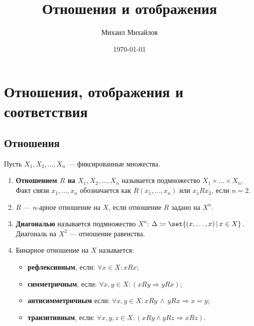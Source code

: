 \documentclass{article}
\title{Отношения и отображения}
\author{Михаил Михайлов}
\date{\today}
\begin{document}
\maketitle
\tableofcontents

\section{Отношения, отображения и соответствия}

\subsection{Отношения}
\begin{definition}
    \label{def:relation}
    Пусть \(X_1, X_2, \ldots, X_n\) --- фиксированные множества.
    
    \begin{enumerate}
        \item \textbf{Отношением \(R\) на \(X_1, X_2, \ldots, X_n\)} называется подмножество \(X_1 \times \ldots \times X_n\). Факт связи \(x_1, \ldots, x_n\) обозначается как \(R(x_1, \ldots, x_n)\) или \(x_1 R x_2\), если \(n = 2\).
        \item \(R\) --- \(n\)-арное отношение на \(X\), если отношение \(R\) задано на \(X^n\).
        \item \textbf{Диагональю} называется подмножество \(X^n\): \(\Delta \coloneq \set{(x,\ldots, x)\,|\, x \in X}\). Диагональ на \(X^2\) --- отношение равенства.
        \item Бинарное отношение на \(X\) называется:
            \begin{itemize}
                \item \textbf{рефлексивным}, если: \(\forall x \in X: x R x \);
                \item \textbf{симметричным}, если: \(\forall x, y \in X: (x R y \Rightarrow y R x)\);
                \item \textbf{антисимметричным} если: \(\forall x, y \in X: x R y \,\land\, y R x \Rightarrow x = y\);
                \item \textbf{транзитивным}, если: \(\forall x, y, z \in X: (x R y \land y R z \Rightarrow x R z)\).
            \end{itemize}
    \end{enumerate}
\end{definition}
    
\end{document}

